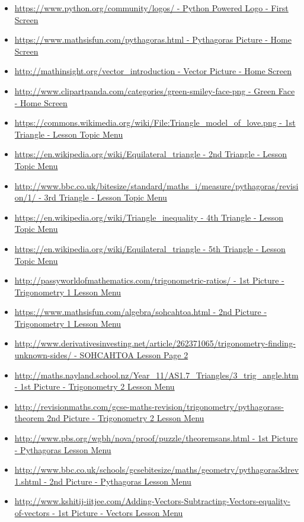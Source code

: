\begin{itemize}
	\item \url{https://www.python.org/community/logos/ - Python Powered Logo - First Screen}
	\item \url{https://www.mathsisfun.com/pythagoras.html - Pythagoras Picture - Home Screen}
	\item \url{http://mathinsight.org/vector_introduction - Vector Picture - Home Screen}
	\item \url{http://www.clipartpanda.com/categories/green-smiley-face-png - Green Face - Home Screen}
	\item \url{https://commons.wikimedia.org/wiki/File:Triangle_model_of_love.png - 1st Triangle - Lesson Topic Menu}
	\item \url{https://en.wikipedia.org/wiki/Equilateral_triangle - 2nd Triangle - Lesson Topic Menu}
	\item \url{http://www.bbc.co.uk/bitesize/standard/maths_i/measure/pythagoras/revision/1/ - 3rd Triangle - Lesson Topic Menu}
	\item \url{https://en.wikipedia.org/wiki/Triangle_inequality - 4th Triangle - Lesson Topic Menu}
	\item \url{https://en.wikipedia.org/wiki/Equilateral_triangle - 5th Triangle - Lesson Topic Menu}
	\item \url{http://passyworldofmathematics.com/trigonometric-ratios/ - 1st Picture - Trigonometry 1 Lesson Menu}
	\item \url{https://www.mathsisfun.com/algebra/sohcahtoa.html - 2nd Picture - Trigonometry 1 Lesson Menu}
	\item \url{http://www.derivativesinvesting.net/article/262371065/trigonometry-finding-unknown-sides/ - SOHCAHTOA Lesson Page 2}
	\item \url{http://maths.nayland.school.nz/Year_11/AS1.7_Triangles/3_trig_angle.htm - 1st Picture - Trigonometry 2 Lesson Menu}
	\item \url{http://revisionmaths.com/gcse-maths-revision/trigonometry/pythagorass-theorem 2nd Picture - Trigonometry 2 Lesson Menu}
	\item \url{http://www.pbs.org/wgbh/nova/proof/puzzle/theoremsans.html - 1st Picture - Pythagoras Lesson Menu}
	\item \url{http://www.bbc.co.uk/schools/gcsebitesize/maths/geometry/pythagoras3drev1.shtml - 2nd Picture - Pythagoras Lesson Menu}
	\item \url{http://www.kshitij-iitjee.com/Adding-Vectors-Subtracting-Vectors-equality-of-vectors - 1st Picture - Vectors Lesson Menu}

\end{itemize}

